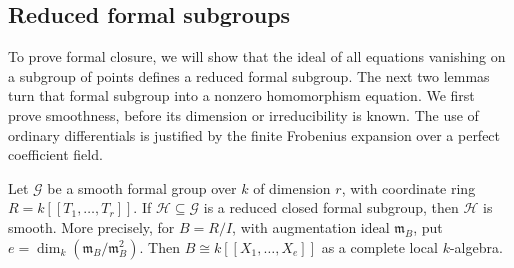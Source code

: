 \subsection{Reduced formal subgroups}

To prove formal closure, we will show that the ideal of all equations
vanishing on a subgroup of points defines a reduced formal subgroup.
The next two lemmas turn that formal subgroup into a nonzero
homomorphism equation. We first prove smoothness, before its dimension
or irreducibility is known. The use of ordinary differentials is
justified by the finite Frobenius expansion over a perfect coefficient
field.

\begin{lemma}\label{formal:reduced-smooth}
Let $\mathcal G$ be a smooth formal group over $k$ of dimension $r$,
with coordinate ring $R=k[[T_1,\ldots,T_r]]$. If
$\mathcal H\subseteq\mathcal G$ is a reduced closed formal subgroup,
then $\mathcal H$ is smooth. More precisely, for
$B=R/I$, with augmentation ideal $\mathfrak m_B$, put
$e=\dim_k(\mathfrak m_B/\mathfrak m_B^2)$. Then
$B\cong k[[X_1,\ldots,X_e]]$ as a complete local $k$-algebra.
\end{lemma}

